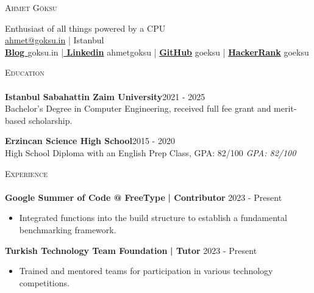 \documentclass[a4paper]{article}
\newcommand{\lineunder} {
    \vspace*{-8pt} \\
    \hspace*{-18pt} \hrulefill \\
}
\newcommand{\header} [1] {
    {\hspace*{-18pt}\vspace*{6pt} \textsc{#1}}
    \vspace*{-6pt} \lineunder
}
\begin{document}
    \vspace*{-40pt}

    

%
%
  \vspace*{-2pt}
  \begin{center}
    {\Huge \scshape {Ahmet Göksu}}\\
    \vspace*{2pt}
    
    
    Enthusiast of all things powered by a CPU\\
    \vspace*{2pt}
    \vspace*{2pt}
    \href{mailto:ahmet@goksu.in}{ahmet@goksu.in} 
    | Istanbul\\
    \vspace*{2pt}
    \textbf{\href{https://ahmet.goksu.in}{Blog }}goksu.in |\textbf{\href{https://www.linkedin.com/in/ahmetgoksu}{ Linkedin}} ahmetgoksu | \textbf{\href{https://www.github.com/goeksu}{GitHub}} goeksu | \textbf{\href{https://www.hackerrank.com/goeksu}{HackerRank}} goeksu\\
  \end{center}



      \header{Education}
      \vspace{2mm}
      \textbf{Istanbul Sabahattin Zaim University}\hfill 2021 - 2025\\
Bachelor's Degree in Computer Engineering, received full fee grant and merit-based scholarship. 

\vspace{2mm}
      \textbf{Erzincan Science High School}\hfill 2015 - 2020\\
High School Diploma with an English Prep Class, GPA: 82/100
{\sl GPA: 82/100}\\
\vspace{2mm}

      \header{Experience}
      \vspace{2mm}
       \textbf{Google Summer of Code @ FreeType}\textbf{ | Contributor} \hfill 2023 - Present\\
          \vspace{-3mm}
\begin{itemize} \itemsep -3pt
\item[] Integrated functions into the build structure to establish a fundamental benchmarking framework.
\end{itemize}
  \textbf{Turkish Technology Team Foundation}\textbf{ | Tutor} \hfill 2023 - Present\\
          \vspace{-3mm}
\begin{itemize} \itemsep -3pt
\item[] Trained and mentored teams for participation in various technology competitions.
\end{itemize}
   
\end{document}
